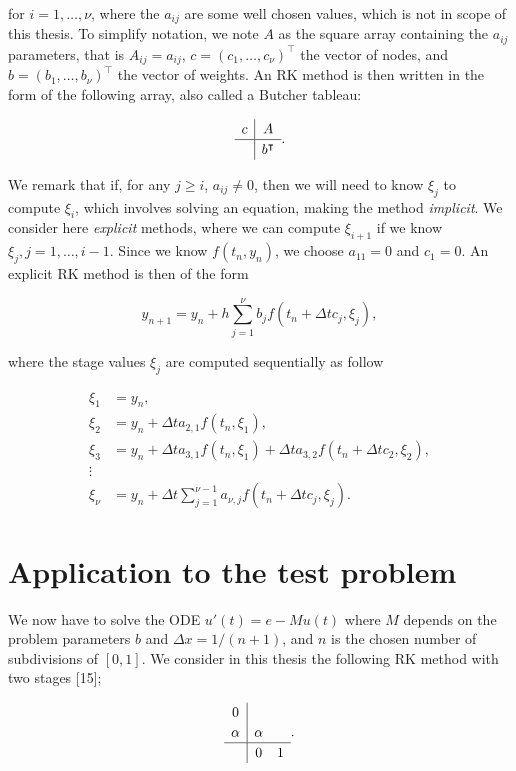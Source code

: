 \documentclass[
  letterpaper,
]{report}
\theoremstyle{definition}
\theoremstyle{plain}
\theoremstyle{definition}
\theoremstyle{remark}
\begin{document}
for \(i = 1,\dots, \nu\), where the \(a_{ij}\) are some well chosen
values, which is not in scope of this thesis. To simplify notation, we
note \(A\) as the square array containing the \(a_{ij}\) parameters,
that is \(A_{ij} = a_{ij}\), \(c = (c_1,\dots,c_\nu)^\intercal\) the
vector of nodes, and \(b = (b_1,\dots, b_\nu)^\intercal\) the vector of
weights. An RK method is then written in the form of the following
array, also called a Butcher tableau:

\[
\renewcommand\arraystretch{1.2}
\begin{array}
{c|c}
c & A\\
\hline & b^\intercal
\end{array}.
\]

We remark that if, for any \(j\geq i\), \(a_{ij} \neq 0\), then we will
need to know \(\xi_j\) to compute \(\xi_i\), which involves solving an
equation, making the method \emph{implicit}. We consider here
\emph{explicit} methods, where we can compute \(\xi_{i+1}\) if we know
\(\xi_j, j = 1 , \dots , i-1\). Since we know \(f(t_n,y_n)\), we choose
\(a_{11} = 0\) and \(c_1 = 0\). An explicit RK method is then of the
form

\[
y_{n+1} = y_n + h\sum_{j=1}^\nu b_j f(t_n+\Delta t c_j,\xi_j),
\]

where the stage values \(\xi_j\) are computed sequentially as follow

\begin{align*}
\xi_1 &= y_n,\\
\xi_2 &= y_n + \Delta t a_{2,1}f(t_n,\xi_1),\\
\xi_3 &= y_n + \Delta t a_{3,1}f(t_n,\xi_1) +  \Delta t a_{3,2}f(t_n+\Delta t c_2,\xi_2),\\
\vdots\\
\xi_\nu &= y_n + \Delta t \sum_{j=1}^{\nu-1} a_{\nu,j}f(t_n + \Delta t c_j,\xi_j).
\end{align*}

\section{Application to the test
problem}\label{sec-RK_solver_test_problem}

We now have to solve the ODE \(u'(t) = e - Mu(t)\) where \(M\) depends
on the problem parameters \(b\) and \(\Delta x = 1 / (n+1)\), and \(n\)
is the chosen number of subdivisions of \([0,1]\). We consider in this
thesis the following RK method with two stages {[}15{]};

\[
\begin{array}
{c|cc}
0 & &\\
 \alpha & \alpha & \\
\hline & 0 & 1
\end{array}.
\]
\end{document}
